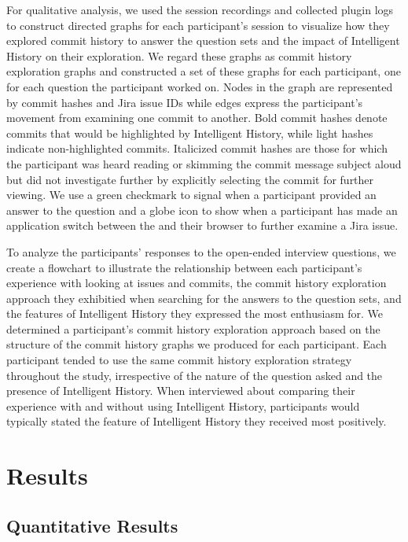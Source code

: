 For qualitative analysis, we used the session recordings and collected plugin logs to construct directed graphs 
for each participant's session to visualize how they explored commit history to answer the question sets and the impact of Intelligent History on their exploration.
We regard these graphs as commit history exploration graphs and constructed a set of these graphs for each participant, one for each question the participant worked on.
Nodes in the graph are represented by commit hashes and Jira issue IDs while edges express the participant's movement from examining one commit to another.
Bold commit hashes denote commits that would be highlighted by Intelligent History, while light hashes indicate non-highlighted commits.
Italicized commit hashes are those for which the participant was heard reading or skimming the commit message subject aloud but did not investigate further by explicitly selecting the commit for further viewing.
We use a green checkmark to signal when a participant provided an answer to the question and a globe icon to show when a participant has made an application switch between the  and their browser to further examine a Jira issue.

To analyze the participants' responses to the open-ended interview questions, 
we create a flowchart to illustrate the relationship between each participant's experience with looking at issues and commits,
the commit history exploration approach they exhibitied when searching for the answers to the question sets, and the features of Intelligent History they expressed the most enthusiasm for.
We determined a participant's commit history exploration approach based on the structure of the commit history graphs we produced for each participant.
Each participant tended to use the same commit history exploration strategy throughout the study, 
irrespective of the nature of the question asked and the presence of Intelligent History.
When interviewed about comparing their experience with and without using Intelligent History,
participants would typically stated the feature of Intelligent History they received most positively.

\section{Results}
\label{sec:Results}

\subsection{Quantitative Results}

